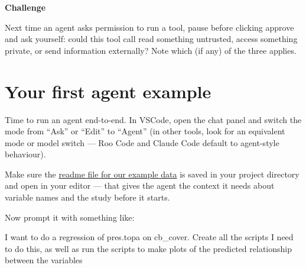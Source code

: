 \documentclass[
  letterpaper,
  DIV=11,
  numbers=noendperiod]{scrreprt}
\begin{document}
\begin{tcolorbox}[enhanced jigsaw, toprule=.15mm, rightrule=.15mm, left=2mm, leftrule=.75mm, breakable, opacityback=0, arc=.35mm, colframe=quarto-callout-important-color-frame, bottomrule=.15mm, colback=white]
\begin{minipage}[t]{5.5mm}
\textcolor{quarto-callout-important-color}{\faExclamation}
\end{minipage}%
\begin{minipage}[t]{\textwidth - 5.5mm}

\vspace{-3mm}\textbf{Challenge}\vspace{3mm}

Next time an agent asks permission to run a tool, pause before clicking
approve and ask yourself: could this tool call read something untrusted,
access something private, or send information externally? Note which (if
any) of the three applies.

\end{minipage}%
\end{tcolorbox}

\chapter{Your first agent example}\label{your-first-agent-example}

Time to run an agent end-to-end. In VSCode, open the chat panel and
switch the mode from ``Ask'' or ``Edit'' to ``Agent'' (in other tools,
look for an equivalent mode or model switch --- Roo Code and Claude Code
default to agent-style behaviour).

Make sure the
\href{https://raw.githubusercontent.com/cbrown5/example-ecological-data/refs/heads/main/data/benthic-reefs-and-fish/readme.md}{readme
file for our example data} is saved in your project directory and open
in your editor --- that gives the agent the context it needs about
variable names and the study before it starts.

Now prompt it with something like:

\begin{tcolorbox}[enhanced jigsaw, bottomtitle=1mm, leftrule=.75mm, breakable, colbacktitle=quarto-callout-note-color!10!white, colframe=quarto-callout-note-color-frame, coltitle=black, toprule=.15mm, rightrule=.15mm, left=2mm, bottomrule=.15mm, title=\textcolor{quarto-callout-note-color}{\faInfo}\hspace{0.5em}{Prompt}, opacityback=0, arc=.35mm, toptitle=1mm, titlerule=0mm, opacitybacktitle=0.6, colback=white]

I want to do a regression of pres.topa on cb\_cover. Create all the
scripts I need to do this, as well as run the scripts to make plots of
the predicted relationship between the variables

\end{tcolorbox}
\end{document}
